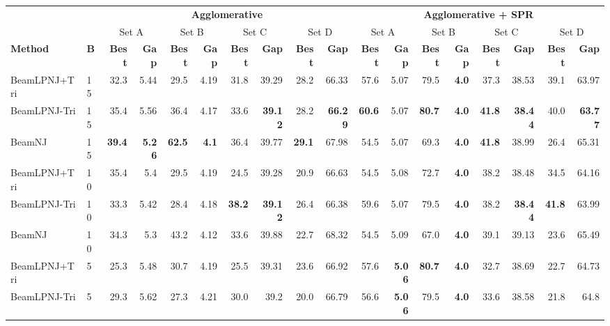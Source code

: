 \begin{tabular}{llrrrrrrrr|rrrrrrrr}
\toprule
&& \multicolumn{8}{c}{\textbf{Agglomerative}} & \multicolumn{8}{c}{\textbf{Agglomerative + SPR}} \\
\cmidrule(lr){3-10} \cmidrule(lr){11-18}
&& \multicolumn{2}{c}{Set A} & \multicolumn{2}{c}{Set B}& \multicolumn{2}{c}{Set C}& \multicolumn{2}{c}{Set D} & \multicolumn{2}{c}{Set A} & \multicolumn{2}{c}{Set B}& \multicolumn{2}{c}{Set C}& \multicolumn{2}{c}{Set D} \\
\cmidrule(lr){3-4} \cmidrule(lr){5-6} \cmidrule(lr){7-8} \cmidrule(lr){9-10} \cmidrule(lr){11-12} \cmidrule(lr){13-14} \cmidrule(lr){15-16} \cmidrule(lr){17-18}
\textbf{Method} & \textbf{B} & \textbf{Best} & \textbf{Gap} & \textbf{Best} & \textbf{Gap} & \textbf{Best} & \textbf{Gap} & \textbf{Best} & \textbf{Gap} & \textbf{Best} & \textbf{Gap} & \textbf{Best} & \textbf{Gap} & \textbf{Best} & \textbf{Gap} & \textbf{Best} & \textbf{Gap} \\
\midrule
BeamLPNJ+Tri & 15 & 32.3 & 5.44 & 29.5 & 4.19 & 31.8 & 39.29 & 28.2 & 66.33 & 57.6 & 5.07 & 79.5 & \textbf{4.0} & 37.3 & 38.53 & 39.1 & 63.97 \\
BeamLPNJ-Tri & 15 & 35.4 & 5.56 & 36.4 & 4.17 & 33.6 & \textbf{39.12} & 28.2 & \textbf{66.29} & \textbf{60.6} & 5.07 & \textbf{80.7} & \textbf{4.0} & \textbf{41.8} & \textbf{38.44} & 40.0 & \textbf{63.77} \\
BeamNJ & 15 & \textbf{39.4} & \textbf{5.26} & \textbf{62.5} & \textbf{4.1} & 36.4 & 39.77 & \textbf{29.1} & 67.98 & 54.5 & 5.07 & 69.3 & \textbf{4.0} & \textbf{41.8} & 38.99 & 26.4 & 65.31 \\
BeamLPNJ+Tri & 10 & 35.4 & 5.4 & 29.5 & 4.19 & 24.5 & 39.28 & 20.9 & 66.63 & 54.5 & 5.08 & 72.7 & \textbf{4.0} & 38.2 & 38.48 & 34.5 & 64.16 \\
BeamLPNJ-Tri & 10 & 33.3 & 5.42 & 28.4 & 4.18 & \textbf{38.2} & \textbf{39.12} & 26.4 & 66.38 & 59.6 & 5.07 & 79.5 & \textbf{4.0} & 38.2 & \textbf{38.44} & \textbf{41.8} & 63.99 \\
BeamNJ & 10 & 34.3 & 5.3 & 43.2 & 4.12 & 33.6 & 39.88 & 22.7 & 68.32 & 54.5 & 5.09 & 67.0 & \textbf{4.0} & 39.1 & 39.13 & 23.6 & 65.49 \\
BeamLPNJ+Tri & 5 & 25.3 & 5.48 & 30.7 & 4.19 & 25.5 & 39.31 & 23.6 & 66.92 & 57.6 & \textbf{5.06} & \textbf{80.7} & \textbf{4.0} & 32.7 & 38.69 & 22.7 & 64.73 \\
BeamLPNJ-Tri & 5 & 29.3 & 5.62 & 27.3 & 4.21 & 30.0 & 39.2 & 20.0 & 66.79 & 56.6 & \textbf{5.06} & 79.5 & \textbf{4.0} & 33.6 & 38.58 & 21.8 & 64.8 \\

\end{tabular}
